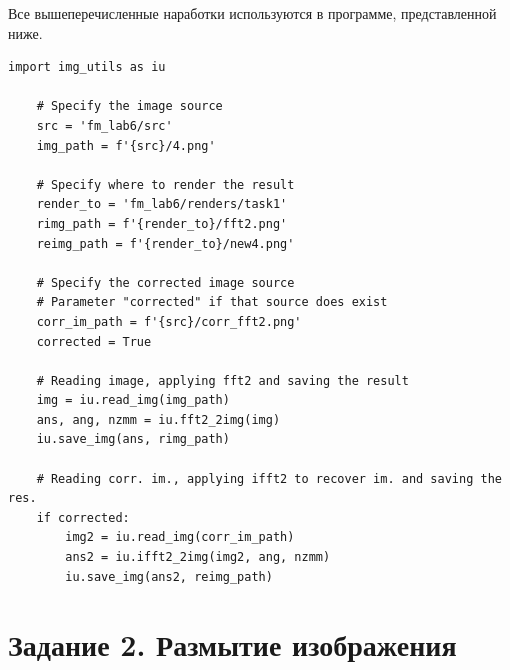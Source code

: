 \documentclass[a4paper, 12pt]{article}
\begin{document}
    Все вышеперечисленные наработки используются в программе, представленной ниже.
    \begin{lstlisting}[label=task11, caption={Реализация задания 1}]
    import img_utils as iu

    # Specify the image source
    src = 'fm_lab6/src'
    img_path = f'{src}/4.png'

    # Specify where to render the result
    render_to = 'fm_lab6/renders/task1'
    rimg_path = f'{render_to}/fft2.png'
    reimg_path = f'{render_to}/new4.png'

    # Specify the corrected image source
    # Parameter "corrected" if that source does exist
    corr_im_path = f'{src}/corr_fft2.png'
    corrected = True

    # Reading image, applying fft2 and saving the result
    img = iu.read_img(img_path)
    ans, ang, nzmm = iu.fft2_2img(img)
    iu.save_img(ans, rimg_path)

    # Reading corr. im., applying ifft2 to recover im. and saving the res.
    if corrected:
        img2 = iu.read_img(corr_im_path)
        ans2 = iu.ifft2_2img(img2, ang, nzmm)
        iu.save_img(ans2, reimg_path)
    \end{lstlisting}


    \section{Задание 2. Размытие изображения}
\end{document}
